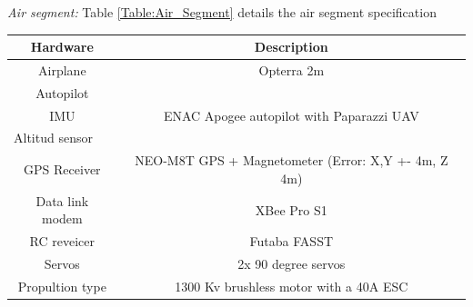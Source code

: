 \textit{Air segment:} Table \ref{Table:Air_Segment} details the air segment specification 
\begin{table}[H]
\centering
\begin{tabular}{|c|c|}
\hline
Hardware                             & Description                                                                                                                                                          \\ \hline
Airplane                             & Opterra 2m                                                                                                                                                           \\ \hline
Autopilot                            & \multirow{3}{*}{ENAC Apogee autopilot with Paparazzi UAV}                                                                                                          \\ \cline{1-1}
IMU                                  &                                                                                                                                                                      \\ \cline{1-1}
\multicolumn{1}{|l|}{Altitud sensor} &                                                                                                                                                                      \\ \hline
GPS Receiver                         & NEO-M8T GPS + Magnetometer (Error: X,Y +- 4m, Z 4m)                                                                                                                                          \\ \hline
Data link modem                      & XBee Pro S1                                                                                                                                                          \\ \hline
RC reveicer                          & Futaba FASST                                                                                                                                                         \\ \hline
Servos                               & 2x 90 degree servos                                                                                                                                                  \\ \hline
Propultion type                      & 1300 Kv brushless motor with a 40A ESC                                                                                                                               \\ \hline

\end{tabular}
\end{table}
